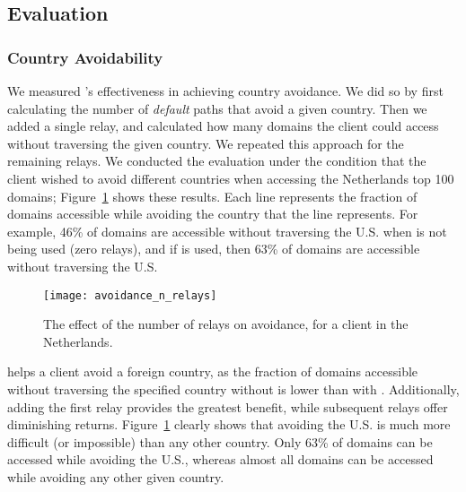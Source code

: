 \subsection{Evaluation}


\subsubsection{Country Avoidability}

We measured \system{}'s effectiveness in achieving country avoidance.  We did so by first 
calculating the number of {\it default} paths that avoid a given country.  Then 
we added a single relay, and calculated how many domains the client could 
access without traversing the given country.  We repeated this approach for 
the remaining relays.  We conducted the evaluation under the condition that 
the client wished to avoid different countries when accessing the Netherlands top 
100 domains; Figure~\ref{fig:avoidance_eval} shows these results.  Each 
line represents the fraction of domains accessible while avoiding the country that 
the line represents.  For example, 46\% of domains are accessible without traversing 
the U.S. when \system{} is not being used (zero relays), and if \system{} is 
used, then 63\% of domains are accessible without traversing the U.S.

\begin{figure}[t]
\tiny
\centering
\texttt{[image: avoidance\_n\_relays]}
\caption{The effect of the number of relays on avoidance, for a client
  in the Netherlands.}
\label{fig:avoidance_eval}
\end{figure}

\system{} helps a client avoid a foreign country,
as the fraction of domains accessible without traversing the specified
country without \system{} is lower than with \system{}.  Additionally,
adding the first relay provides the greatest benefit, while subsequent
relays offer diminishing returns.  Figure~\ref{fig:avoidance_eval}
clearly shows that avoiding the U.S. is much more difficult (or
impossible) than any other country.  Only 63\% of domains can be
accessed while avoiding the U.S., whereas almost all domains can be
accessed while avoiding any other given country.


